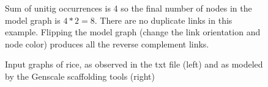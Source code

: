 \documentclass[12pt]{article}
\begin{document}
\begin{figure}[h!]
\begin{center}
\end{center}
\caption{Input graphs of rice, as observed in the txt file (left) and as modeled by the Genscale scaffolding tools (right)}
\footnotesize Sum of unitig occurrences is 4 so the final number of nodes in the model graph is $4*2=8$. There are no duplicate links in this example. Flipping the model graph (change the link orientation and node color) produces all the reverse complement links.
\label{fig:riceinpt}
\end{figure}
\newpage
\end{document}
